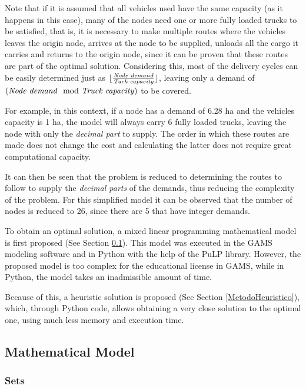 \documentclass{amsart}
\begin{document}
    Note that if it is assumed that all vehicles used have the same capacity (as it happens in this case), many of the nodes need one or more fully loaded trucks to be satisfied, that is, it is necessary to make multiple routes where the vehicles leaves the origin node, arrives at the node to be supplied, unloads all the cargo it carries and returns to the origin node, since it can be proven that these routes are part of the optimal solution. Considering this, most of the delivery cycles can be easily determined just as $\lfloor\frac{\text{\textit{Node demand}}}{\text{\textit{Tuck capacity}}}\rfloor$, leaving only a demand of $\left( \text{\textit{Node demand}} \mod \text{\textit{Truck capacity}} \right)$ to be covered.
    
    For example, in this context, if a node has a demand of 6.28 ha and the vehicles capacity is 1 ha, the model will always carry 6 fully loaded trucks, leaving the node with only the \textit{decimal part} to supply. The order in which these routes are made does not change the cost and calculating the latter does not require great computational capacity.

    It can then be seen that the problem is reduced to determining the routes to follow to supply the \textit{decimal parts} of the demands, thus reducing the complexity of the problem. For this simplified model it can be observed that the number of nodes is reduced to 26, since there are 5 that have integer demands.

    To obtain an optimal solution, a mixed linear programming mathematical model is first proposed (See Section \ref{ModeloMatematico}). This model was executed in the GAMS modeling software and in Python with the help of the PuLP library. However, the proposed model is too complex for the educational license in GAMS, while in Python, the model takes an inadmissible amount of time.

        Because of this, a heuristic solution is proposed (See Section \ref{MetodoHeuristico}), which, through Python code, allows obtaining a very close solution to the optimal one, using much less memory and execution time.

    \subsection{Mathematical Model}\label{ModeloMatematico}
        \subsubsection{Sets} 
        
\end{document}

